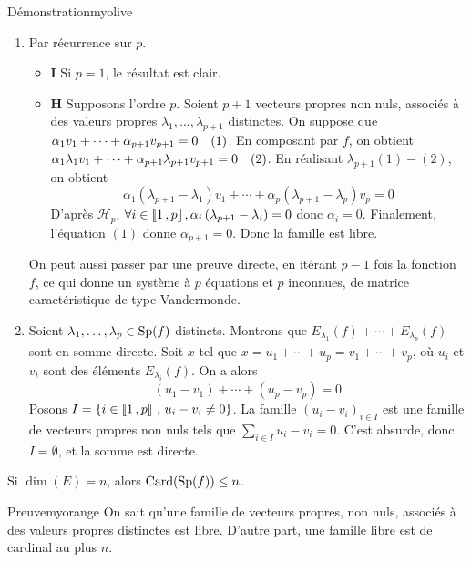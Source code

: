     \begin{demo}{Démonstration}{myolive}
        \begin{enumerate}
            \item Par récurrence sur $p$.
            \begin{itemize}
                \item \textbf{I} \quad Si $p = 1$, le résultat est clair.
                \item \textbf{H} \quad Supposons l’ordre $p$. Soient $p+1$ vecteurs propres non nuls, associés à des valeurs propres $\lambda_1,\ldots, \lambda_{p+1}$ distinctes. On suppose que $\alpha_1 v_1 + \cdots + \alpha_{p+1} v_{p+1} = 0 \quad (\text{1})$. En composant par $f$, on obtient $\alpha_1 \lambda_1 v_1 + \cdots + \alpha_{p+1} \lambda_{p+1} v_{p+1} = 0 \quad (\text{2})$. En réalisant $\lambda_{p+1} (1) - (2)$, on obtient 
                \[ \alpha_1 (\lambda_{p+1} - \lambda_1) v_1 + \cdots + \alpha_p (\lambda_{p+1} - \lambda_p) v_p = 0 \]    
                D’après $\mathcal{H}_p$, $\forall i \in \left\llbracket 1 \, , p \right\rrbracket, \alpha_i \left(\lambda_{p+1} - \lambda_i\right) = 0$ donc $\alpha_i = 0$. Finalement, l’équation $(1)$ donne $\alpha_{p+1} = 0$. Donc la famille est libre.
            \end{itemize}
            On peut aussi passer par une preuve directe, en itérant $p-1$ fois la fonction $f$, ce qui donne un système à $p$ équations et $p$ inconnues, de matrice caractéristique de type Vandermonde.
            \item Soient $\lambda_1, \ldots, \lambda_p \in \operatorname{Sp}(f)$ distincts. Montrons que $E_{\lambda_1}(f) + \cdots + E_{\lambda_p}(f)$ sont en somme directe. Soit $x$ tel que $x = u_1 + \cdots + u_p = v_1 + \cdots + v_p$, où $u_i$ et $v_i$ sont des éléments $E_{\lambda_i}(f)$. On a alors 
            \[ (u_1 - v_1) + \cdots + (u_p - v_p) = 0 \]   
            Posons $I = \left\{ i \in \left\llbracket 1 \, , p \right\rrbracket \, , \, u_i - v_i \neq 0 \right\}$. La famille $(u_i - v_i)_{i \in I}$ est une famille de vecteurs propres non nuls tels que $\sum_{i \in I} u_i - v_i = 0$. C’est absurde, donc $I = \emptyset$, et la somme est directe.
        \end{enumerate}
    \end{demo}

    \begin{coro}{}{}
        Si $\dim(E) = n$, alors $\operatorname{Card}(\operatorname{Sp}(f)) \leq n$.
    \end{coro}

    \begin{demo}{Preuve}{myorange}
        On sait qu’une famille de vecteurs propres, non nuls, associés à des valeurs propres distinctes est libre. D’autre part, une famille libre est de cardinal au plus $n$.
    \end{demo}

